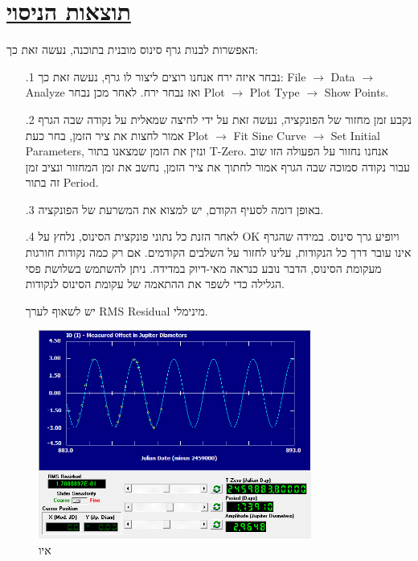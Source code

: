 \documentclass[a4paper, 12pt]{article}
\begin{document}
    \section{\underline{תוצאות הניסוי}}
    \begin{flushright}
        האפשרות לבנות גרף סינוס מובנית בתוכנה, נעשה זאת כך:
        \begin{enumerate}
            \item[.1] נבחר איזה ירח אנחנו רוצים ליצור לו גרף, נעשה זאת כך: 
            \textenglish{File $\rightarrow$ Data $\rightarrow$ Analyze} ואז נבחר ירח.
            לאחר מכן נבחר \textenglish{Plot $\rightarrow$ Plot Type $\rightarrow$ Show Points}.
            \item[.2] נקבע זמן מחזור של הפונקציה, נעשה זאת על ידי לחיצה שמאלית על נקודה שבה 
            הגרף אמור לחצות את ציר הזמן, בחר כעת
            \textenglish{Plot $\rightarrow$ Fit Sine Curve $\rightarrow$ Set Initial Parameters},
            ונזין את הזמן שמצאנו בתור \textenglish{T-Zero}.
            אנחנו נחזור על הפעולה הזו שוב עבור נקודה סמוכה שבה הגרף אמור לחתוך את ציר הזמן,
            נחשב את זמן המחזור ונציב זמן זה בתור \textenglish{Period}.
            \item[.3] באופן דומה לסעיף הקודם, יש למצוא את המשרעת של הפונקציה.
            \item[.4] לאחר הזנת כל נתוני פונקצית הסינוס, נלחץ על \textenglish{OK} ויופיע גרך סינוס.
            במידה שהגרף אינו עובר דרך כל הנקודות, עלינו לחזור על השלבים הקודמים. אם רק כמה נקודות
            חורגות מעקומת הסינוס, הדבר נובע כנראה מאי-דיוק במדידה.
            ניתן להשתמש בשלושת פסי הגלילה כדי לשפר את ההתאמה של עקומת הסינוס לנקודות.

            יש לשאוף לערך \textenglish{RMS Residual} מינימלי.
        \end{enumerate}
    \end{flushright}


    \pagebreak %

    \begin{figure}[h!]
        \centering
        \includegraphics[width=0.8\textwidth]{../assets/io_graph.png}
        \caption{איו}
    \end{figure}
\end{document}
